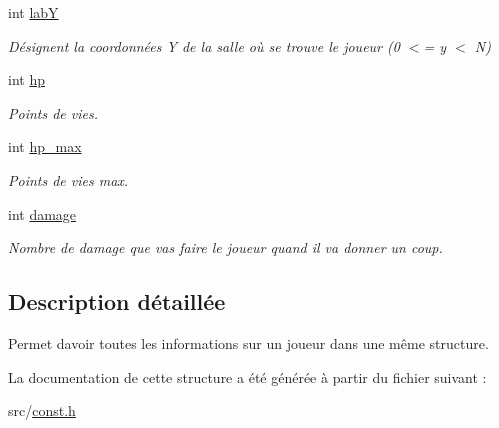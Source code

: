 \begin{DoxyCompactItemize}
int \hyperlink{structs__player_a3640ccc04b8a35ce5990d3ecec8edc4d}{labY}
\begin{DoxyCompactList}\small\item\em Désignent la coordonnées Y de la salle où se trouve le joueur (0 $<$= y $<$ N) \end{DoxyCompactList}\item 
\mbox{\label{structs__player_a9f38903bef5e97802df8b564cdb39687}} 
int \hyperlink{structs__player_a9f38903bef5e97802df8b564cdb39687}{hp}
\begin{DoxyCompactList}\small\item\em Points de vies. \end{DoxyCompactList}\item 
\mbox{\label{structs__player_a0b8f470fa5a98a2fbf26331ba82d7fdf}} 
int \hyperlink{structs__player_a0b8f470fa5a98a2fbf26331ba82d7fdf}{hp\+\_\+max}
\begin{DoxyCompactList}\small\item\em Points de vies max. \end{DoxyCompactList}\item 
\mbox{\label{structs__player_aada4e2320dabdc95637fd0266a4fe678}} 
int \hyperlink{structs__player_aada4e2320dabdc95637fd0266a4fe678}{damage}
\begin{DoxyCompactList}\small\item\em Nombre de damage que vas faire le joueur quand il va donner un coup. \end{DoxyCompactList}\end{DoxyCompactItemize}


\subsection{Description détaillée}
Permet d\textquotesingle{}avoir toutes les informations sur un joueur dans une même structure. 

La documentation de cette structure a été générée à partir du fichier suivant \+:\begin{DoxyCompactItemize}
\item 
src/\hyperlink{const_8h}{const.\+h}\end{DoxyCompactItemize}
